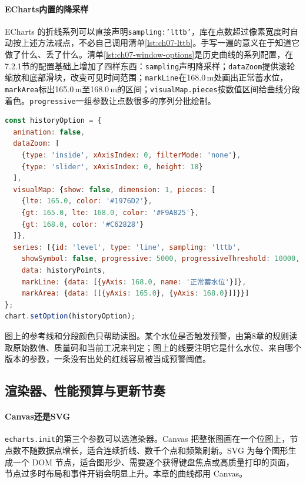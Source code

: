 \paragraph{ECharts内置的降采样}ECharts 的折线系列可以直接声明\texttt{sampling:'lttb'}，库在点数超过像素宽度时自动按上述方法减点，不必自己调用清单\ref{lst:ch07-lttb}。手写一遍的意义在于知道它做了什么、丢了什么。清单\ref{lst:ch07-window-options}是历史曲线的系列配置，在7.2.1节的配置基础上增加了四样东西：\texttt{sampling}声明降采样；\texttt{dataZoom}提供滚轮缩放和底部滑块，改变可见时间范围；\texttt{markLine}在168.0\,m处画出正常蓄水位，\texttt{markArea}标出165.0\,m至168.0\,m的区间；\texttt{visualMap.pieces}按数值区间给曲线分段着色。\texttt{progressive}一组参数让点数很多的序列分批绘制。

\begin{lstlisting}[label={lst:ch07-window-options},language=JavaScript,breaklines=true,caption={历史曲线的降采样、缩放与阈值带}]
const historyOption = {
  animation: false,
  dataZoom: [
    {type: 'inside', xAxisIndex: 0, filterMode: 'none'},
    {type: 'slider', xAxisIndex: 0, height: 18}
  ],
  visualMap: {show: false, dimension: 1, pieces: [
    {lte: 165.0, color: '#1976D2'},
    {gt: 165.0, lte: 168.0, color: '#F9A825'},
    {gt: 168.0, color: '#C62828'}
  ]},
  series: [{id: 'level', type: 'line', sampling: 'lttb',
    showSymbol: false, progressive: 5000, progressiveThreshold: 10000,
    data: historyPoints,
    markLine: {data: [{yAxis: 168.0, name: '正常蓄水位'}]},
    markArea: {data: [[{yAxis: 165.0}, {yAxis: 168.0}]]}}]
};
chart.setOption(historyOption);
\end{lstlisting}

图上的参考线和分段颜色只帮助读图。某个水位是否触发预警，由第8章的规则读取原始数值、质量码和当前工况来判定；图上的线要注明它是什么水位、来自哪个版本的参数，一条没有出处的红线容易被当成预警阈值。

\subsection{渲染器、性能预算与更新节奏}

\paragraph{Canvas还是SVG}\texttt{echarts.init}的第三个参数可以选渲染器。Canvas 把整张图画在一个位图上，节点数不随数据点增长，适合连续折线、数千个点和频繁刷新。SVG 为每个图形生成一个 DOM 节点，适合图形少、需要逐个获得键盘焦点或高质量打印的页面，节点过多时布局和事件开销会明显上升。本章的曲线都用 Canvas。

